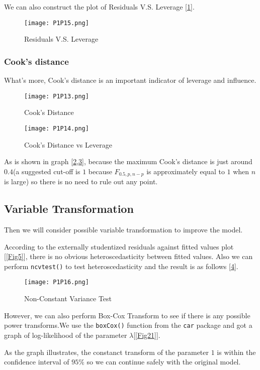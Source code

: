 \documentclass[11pt]{article}
\begin{document}
We can also construct the plot of Residuals V.S. Leverage [\ref{Fig10}].
\begin{figure}[!htb]
\centering
\texttt{[image: P1P15.png]}
\caption{Residuals V.S. Leverage}\label{Fig10}
\end{figure}

\subsubsection{Cook's distance}

What's more, Cook's distance is an important indicator of leverage and influence.
\begin{figure}[!htb]
\centering
\texttt{[image: P1P13.png]}
\caption{Cook's Distance}\label{Fig11}
\end{figure}

\begin{figure}[!htb]
\centering
\texttt{[image: P1P14.png]}
\caption{Cook's Distance vs Leverage}\label{Fig12}
\end{figure}
As is shown in graph [\ref{Fig11},\ref{Fig12}], because the maximum Cook's distance is just around $0.4$(a suggested cut-off is $1$ because $F_{0.5,p,n-p}$ is approximately equal to $1$ when $n$ is large) so there is no need to rule out any point.

\subsection{Variable Transformation}\label{ch4}

Then we will consider possible variable transformation to improve the model.

According to the externally studentized residuals against fitted values plot [\ref{Fig5}], there is no obvious heteroscedasticity between fitted values. Also we can perform \verb|ncvtest()| to test heteroscedasticity and the result is as follows [\ref{Fig13}].

\begin{figure}[!htb]
\centering
\texttt{[image: P1P16.png]}
\caption{Non-Constant Variance Test}\label{Fig13}
\end{figure}

However, we can also perform Box-Cox Transform to see if there is any possible power transforms.We use the \verb|boxCox()| function from the \verb|car| package and got a graph of log-likelihood of the parameter $\lambda$[\ref{Fig21}].

As the graph illustrates, the constanct transform of the parameter $1$ is within the confidence interval of $95\%$ so we can continue safely with the original model.
\end{document}
